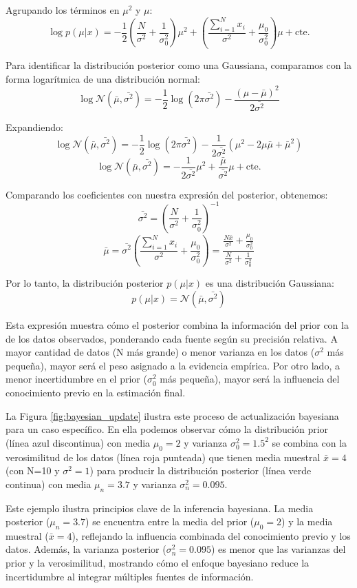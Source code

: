 Agrupando los términos en \(\mu^2\) y \(\mu\):
\[\log p(\mu|x)=-\frac{1}{2}\left(\frac{N}{\sigma^2}+\frac{1}{\sigma_{0}^2}\right)\mu^2+\left(\frac{\sum_{i=1}^{N}x_i}{\sigma^2}+\frac{\mu_0}{\sigma_0^2}\right)\mu+\text{cte.}\]

Para identificar la distribución posterior como una Gaussiana, comparamos con la forma logarítmica de una distribución normal:
\[\log \mathcal{N}(\bar{\mu},\bar{\sigma^2}) = -\frac{1}{2}\log(2\pi\bar{\sigma^2}) - \frac{(\mu-\bar{\mu})^2}{2\bar{\sigma^2}}\]

Expandiendo:
\[\log \mathcal{N}(\bar{\mu},\bar{\sigma^2}) = -\frac{1}{2}\log(2\pi\bar{\sigma^2}) - \frac{1}{2\bar{\sigma^2}}(\mu^2 - 2\mu\bar{\mu} + \bar{\mu}^2)\]
\[\log \mathcal{N}(\bar{\mu},\bar{\sigma^2}) = -\frac{1}{2\bar{\sigma^2}}\mu^2 + \frac{\bar{\mu}}{\bar{\sigma^2}}\mu + \text{cte.}\]

Comparando los coeficientes con nuestra expresión del posterior, obtenemos:
\[\bar{\sigma^2} = \left(\frac{N}{\sigma^2} + \frac{1}{\sigma_0^2}\right)^{-1}\]
\[\bar{\mu} = \bar{\sigma^2}\left(\frac{\sum_{i=1}^{N}x_i}{\sigma^2} + \frac{\mu_0}{\sigma_0^2}\right) = \frac{\frac{N\bar{x}}{\sigma^2} + \frac{\mu_0}{\sigma_0^2}}{\frac{N}{\sigma^2} + \frac{1}{\sigma_0^2}}\]

Por lo tanto, la distribución posterior \(p(\mu|x)\) es una distribución Gaussiana:
\[p(\mu|x) = \mathcal{N}(\bar{\mu}, \bar{\sigma^2})\]

Esta expresión muestra cómo el posterior combina la información del prior con la de los datos observados, ponderando cada fuente según su precisión relativa. A mayor cantidad de datos (N más grande) o menor varianza en los datos ($\sigma^2$ más pequeña), mayor será el peso asignado a la evidencia empírica. Por otro lado, a menor incertidumbre en el prior ($\sigma_0^2$ más pequeña), mayor será la influencia del conocimiento previo en la estimación final.

La Figura \ref{fig:bayesian_update} ilustra este proceso de actualización bayesiana para un caso específico. En ella podemos observar cómo la distribución prior (línea azul discontinua) con media $\mu_0=2$ y varianza $\sigma_0^2=1.5^2$ se combina con la verosimilitud de los datos (línea roja punteada) que tienen media muestral $\bar{x}=4$ (con N=10 y $\sigma^2=1$) para producir la distribución posterior (línea verde continua) con media $\mu_n=3.7$ y varianza $\sigma_n^2=0.095$.

Este ejemplo ilustra principios clave de la inferencia bayesiana. La media posterior ($\mu_n=3.7$) se encuentra entre la media del prior ($\mu_0=2$) y la media muestral ($\bar{x}=4$), reflejando la influencia combinada del conocimiento previo y los datos. Además, la varianza posterior ($\sigma_n^2=0.095$) es menor que las varianzas del prior y la verosimilitud, mostrando cómo el enfoque bayesiano reduce la incertidumbre al integrar múltiples fuentes de información.



